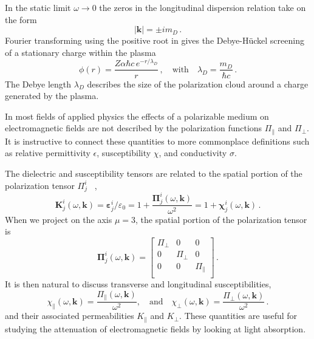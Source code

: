 In the static limit $\omega \rightarrow 0$ the zeros in the longitudinal dispersion relation take on the form
\begin{equation}
    |\mathbf{k}| = \pm  i m_D \,.
\end{equation}
Fourier transforming using the positive root in  gives the Debye-H\"uckel screening of a stationary charge within the plasma \cite{Debye:1923}
\begin{equation}
    \phi(r) = \frac{Z \alpha \hbar c \, e^{-r/\lambda_D}}{r}\,, \quad \text{with} \quad  \lambda_D = \frac{m_D}{\hbar c}\,.
\end{equation}
The Debye length $\lambda_D$ describes the size of the polarization cloud around a charge generated by the plasma.

In most fields of applied physics the effects of a polarizable medium on electromagnetic fields are not described by the polarization functions $\Pi_\parallel$ and $\Pi_\perp$. It is instructive to connect these quantities to more commonplace definitions such as relative permittivity $\epsilon$, susceptibility $\chi$, and conductivity $\sigma$.

The dielectric and susceptibility tensors are related to the spatial portion of the polarization tensor $\Pi^i_j$ ~\cite{Starke:2014tfa,melrose2008quantum},
\begin{equation}\label{dielten}
     \boldsymbol{K}^i_j(\omega,\boldsymbol{k}) = \boldsymbol{\varepsilon}^i_j/\varepsilon_0 = 1+\frac{\boldsymbol{\Pi}^i_j(\omega,\boldsymbol{k})}{\omega^2} = 1+\boldsymbol{\chi}^i_j(\omega,\boldsymbol{k})\,.
\end{equation}
When we project on the axis $\mu =3$, the spatial portion of the polarization tensor is
 \begin{equation}
    \boldsymbol{\Pi}^{i}_{j}(\omega,\boldsymbol{k}) = \left[
    \begin{array}{ccc}
  \Pi_{\perp} & 0 & 0 \\
  0 & \Pi_{\perp} & 0 \\
  0& 0 & \Pi_{\parallel} \\ 
\end{array}
\right]\,.
\end{equation}
It is then natural to discuss transverse and longitudinal susceptibilities,
\begin{equation}\label{eq:chi}
    \chi_\parallel(\omega,\boldsymbol{k}) =\frac{\Pi_\parallel(\omega,\boldsymbol{k})}{\omega^2}, \quad \text{and} \quad \chi_\perp(\omega,\boldsymbol{k}) = \frac{\Pi_\perp(\omega,\boldsymbol{k})}{\omega^2}\,.
\end{equation}
and their associated permeabilities $K_\parallel$ and $K_\perp$. These quantities are useful for studying the attenuation of electromagnetic fields by looking at light absorption.

